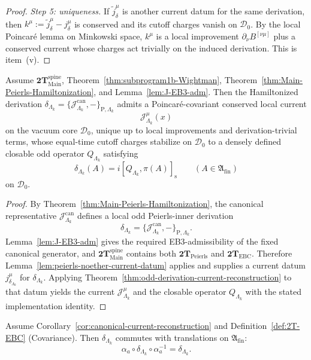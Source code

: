 \begin{proof}
\smallskip\noindent\textit{Step 5: uniqueness.}
If \(\widetilde j^\mu_\delta\) is another current datum for the same derivation, then
\(k^\mu:=\widetilde j^\mu_\delta-j^\mu_\delta\) is conserved and its cutoff charges vanish
on \(\mathcal D_0\). By the local Poincar\'e lemma on Minkowski space, \(k^\mu\) is a local
improvement \(\partial_\nu B^{[\nu\mu]}\) plus a conserved current whose charges act
trivially on the induced derivation. This is item~\textnormal{(v)}.
\end{proof}

\begin{corollary}
\label{cor:canonical-current-reconstruction}
Assume \(\mathbf{2T}_{\mathrm{Main}}^{\mathrm{spine}}\),
Theorem~\ref{thm:subprogram1b-Wightman},
Theorem~\ref{thm:Main-Peierls-Hamiltonization},
and Lemma~\ref{lem:J-EB3-adm}.
Then the Hamiltonized derivation
\(\delta_{\Lambda_k}=\{\mathcal J^{\mathrm{can}}_{\Lambda_k},-\}_{\mathrm P,\Lambda_k}\)
admits a Poincar\'e-covariant conserved local current
\[
\mathcal J^\mu_{\Lambda_k}(x)
\]
on the vacuum core \(\mathcal D_0\), unique up to local improvements and
derivation-trivial terms, whose equal-time cutoff charges stabilize on \(\mathcal D_0\)
to a densely defined closable odd operator \(Q_{\Lambda_k}\) satisfying
\[
\delta_{\Lambda_k}(A)=i[Q_{\Lambda_k},\pi(A)]_{\mathrm s}
\qquad(A\in\mathfrak A_{\mathrm{fin}})
\]
on \(\mathcal D_0\).
\end{corollary}

\begin{proof}
By Theorem~\ref{thm:Main-Peierls-Hamiltonization}, the canonical representative
\(\mathcal J^{\mathrm{can}}_{\Lambda_k}\) defines a local odd Peierls-inner derivation
\[
\delta_{\Lambda_k}=\{\mathcal J^{\mathrm{can}}_{\Lambda_k},-\}_{\mathrm P,\Lambda_k}.
\]
Lemma~\ref{lem:J-EB3-adm} gives the required EB3-admissibility of the fixed canonical
generator, and \(\mathbf{2T}_{\mathrm{Main}}^{\mathrm{spine}}\) contains both
\(\mathbf{2T}_{\mathrm{Peierls}}\) and \(\mathbf{2T}_{\mathrm{EBC}}\).
Therefore Lemma~\ref{lem:peierls-noether-current-datum} applies and supplies a current
datum \(j^\mu_{\delta_{\Lambda_k}}\) for \(\delta_{\Lambda_k}\).
Applying Theorem~\ref{thm:odd-derivation-current-reconstruction} to that datum yields
the current \(\mathcal J^\mu_{\Lambda_k}\) and the closable operator \(Q_{\Lambda_k}\)
with the stated implementation identity.
\end{proof}

\begin{theorem}
\label{lem:delta-poincare}
Assume Corollary~\ref{cor:canonical-current-reconstruction} and
Definition~\ref{def:2T-EBC} \textnormal{(Covariance)}. Then
\(\delta_{\Lambda_k}\) commutes with translations on
\(\mathfrak A_{\mathrm{fin}}\):
\[
\alpha_a\circ \delta_{\Lambda_k} \circ \alpha_a^{-1} = \delta_{\Lambda_k}.
\]
\end{theorem}

